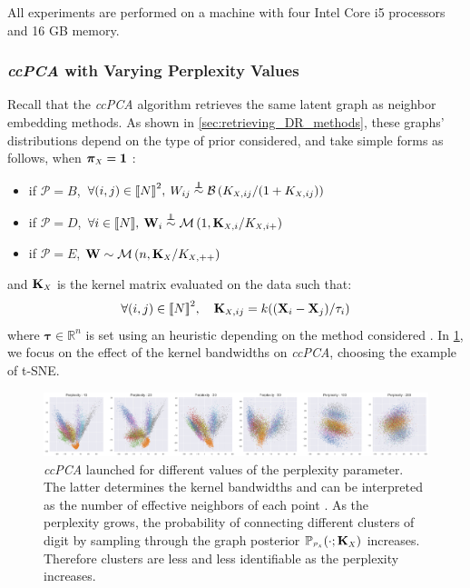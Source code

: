 All experiments are performed on a
machine with four Intel Core i5 processors and 16 GB memory.

\subsubsection{\textit{ccPCA} with Varying Perplexity Values}\label{sec:other_perp}

Recall that the \textit{ccPCA} algorithm retrieves the same latent graph as neighbor embedding methods. As shown in \cref{sec:retrieving_DR_methods}, these graphs' distributions depend on the type of prior considered, and take simple forms as follows, when $\bm{\pi}_{\scaleto{X}{4pt}} = \bm{1}$ :
\begin{itemize}
    \item if $\mathcal{P} = B$, $\forall (i,j) \in \integ{N}^2, \: W_{ij} \stackrel{\perp\!\!\!\!\perp}{\sim} \mathcal{B}\left(K_{\scaleto{X}{4pt},ij}/(1 + K_{\scaleto{X}{4pt},ij}) \right)$
    \item if $\mathcal{P} = D$, $\forall i \in \integ{N}, \: \W_{i} \stackrel{\perp\!\!\!\!\perp}{\sim} \mathcal{M}\left(1, \mK_{\scaleto{X}{4pt},i}/K_{\scaleto{X}{4pt},i+} \right)$
    \item if $\mathcal{P} = E$, $\W \sim \mathcal{M}\left(n, \mK_{\scaleto{X}{4pt}}/ K_{\scaleto{X}{4pt},++} \right)$
\end{itemize}
and $\mK_{\scaleto{X}{4pt}}$ is the kernel matrix evaluated on the data such that:
$$\forall (i,j) \in \integ{N}^2, \quad \mK_{\scaleto{X}{4pt},ij} = k((\X_{i} - \X_{j})/\tau_{i})$$
where $\bm{\tau} \in \mathbb{R}^n$ is set using an heuristic depending on the method considered \citep{maaten2008tSNE, mcinnes2018umap, tang2016visualizing}. In \cref{fig:ccPCA_perp}, we focus on the effect of the kernel bandwidths on \textit{ccPCA}, choosing the example of t-SNE.

\begin{figure}[h]
\vskip 0.2in
\begin{center}
\centerline{\includegraphics[width=\columnwidth]{figures/GraphCoupling/multi_perp.png}}
\caption{\textit{ccPCA} launched for different values of the perplexity parameter. The latter determines the kernel bandwidths and can be interpreted as the number of effective neighbors of each point \citep{maaten2008tSNE}. As the perplexity grows, the probability of connecting different clusters of digit by sampling through the graph posterior $\mathbb{P}_{\scaleto{\mathcal{P}_X}{4pt}}(\cdot;\mK_{\scaleto{X}{4pt}})$ increases. Therefore clusters are less and less identifiable as the perplexity increases.}
\label{fig:ccPCA_perp}
\end{center}
\end{figure}

